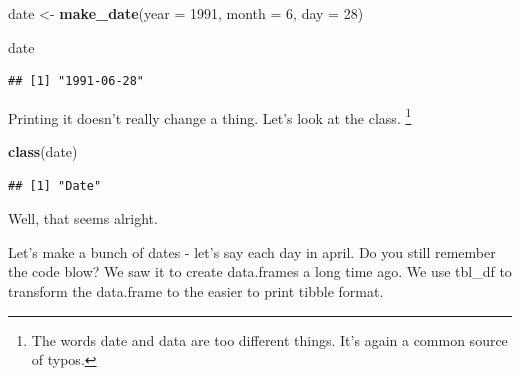 \documentclass[]{tufte-book}
\newenvironment{Shaded}{}{}
\newcommand{\DataTypeTok}[1]{\textcolor[rgb]{0.56,0.13,0.00}{#1}}
\newcommand{\DecValTok}[1]{\textcolor[rgb]{0.25,0.63,0.44}{#1}}
\newcommand{\KeywordTok}[1]{\textcolor[rgb]{0.00,0.44,0.13}{\textbf{#1}}}
\newcommand{\NormalTok}[1]{#1}
\newcommand{\OperatorTok}[1]{\textcolor[rgb]{0.40,0.40,0.40}{#1}}
\newcommand{\StringTok}[1]{\textcolor[rgb]{0.25,0.44,0.63}{#1}}
\begin{document}
\begin{Shaded}
\begin{Highlighting}[]
\NormalTok{date <-}\StringTok{ }\KeywordTok{make_date}\NormalTok{(}\DataTypeTok{year =} \DecValTok{1991}\NormalTok{, }\DataTypeTok{month =} \DecValTok{6}\NormalTok{, }\DataTypeTok{day =} \DecValTok{28}\NormalTok{)}
\end{Highlighting}
\end{Shaded}

\begin{Shaded}
\begin{Highlighting}[]
\NormalTok{date}
\end{Highlighting}
\end{Shaded}

\begin{verbatim}
## [1] "1991-06-28"
\end{verbatim}

Printing it doesn't really change a thing. Let's look at the class. \footnote{The words date and data are too different things. It's again a common source of typos.}

\begin{Shaded}
\begin{Highlighting}[]
\KeywordTok{class}\NormalTok{(date)}
\end{Highlighting}
\end{Shaded}

\begin{verbatim}
## [1] "Date"
\end{verbatim}

Well, that seems alright.

Let's make a bunch of dates - let's say each day in april. Do you still remember the code blow? We saw it to create data.frames a long time ago. We use tbl\_df to transform the data.frame to the easier to print tibble format.

\begin{Shaded}
\end{Shaded}
\end{document}
